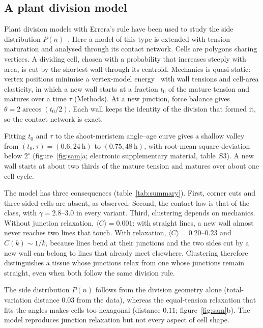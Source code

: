 \documentclass[11pt,a4paper]{article}
\begin{document}
\subsection{A plant division model}
\label{sec:plantmodel}

Plant division models with Errera's rule have been used to study the side distribution
$P(n)$~\cite{gibson2006,sahlin2010}. Here a model of this type is extended with tension
maturation and analysed through its contact network. Cells are polygons sharing vertices. A
dividing cell, chosen with a probability that increases steeply with area, is cut by the
shortest wall through its centroid. Mechanics is quasi-static: vertex positions minimise a
vertex-model energy~\cite{farhadifar2007} with wall tensions and cell-area elasticity, in which
a new wall starts at a fraction $t_0$ of the mature tension and matures over a time $\tau$
(Methods). At a new junction, force balance gives $\theta=2\arccos(t_0/2)$. Each wall keeps the
identity of the division that formed it, so the contact network is exact.

Fitting $t_0$ and $\tau$ to the shoot-meristem angle--age curve gives a shallow valley from
$(t_0,\tau)=(0.6,24~\mathrm{h})$ to $(0.75,48~\mathrm{h})$, with root-mean-square deviation
below $2^\circ$ (figure~\ref{fig:sam}a; electronic supplementary material, table~S3). A new
wall starts at about two thirds of the mature tension and matures over about one cell cycle.

The model has three consequences (table~\ref{tab:summary}). First, corner cuts and three-sided
cells are absent, as observed. Second, the contact law is that of the class, with
$\gamma=2.8$--$3.0$ in every variant. Third, clustering depends on mechanics. Without junction
relaxation, $\langle C\rangle=0.001$: with straight lines, a new wall almost never reaches two
lines that touch. With relaxation, $\langle C\rangle=0.20$--$0.23$ and $C(k)\sim1/k$, because
lines bend at their junctions and the two sides cut by a new wall can belong to lines that
already meet elsewhere. Clustering therefore distinguishes a tissue whose junctions relax from
one whose junctions remain straight, even when both follow the same division rule.

The side distribution $P(n)$ follows from the division geometry alone (total-variation
distance $0.03$ from the data), whereas the equal-tension relaxation that fits the angles makes
cells too hexagonal (distance $0.11$; figure~\ref{fig:sam}b). The model reproduces junction
relaxation but not every aspect of cell shape.
\end{document}
